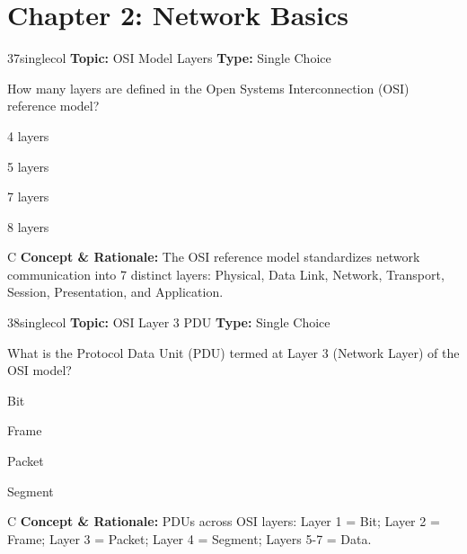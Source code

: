 \section{Chapter 2: Network Basics}

\begin{qcard}{37}{singlecol}
\textcolor{darkslate!75}{\small\textbf{Topic:} OSI Model Layers \hfill \textbf{Type:} Single Choice}\vspace{0.4em}\par
How many layers are defined in the Open Systems Interconnection (OSI) reference model?
\begin{qoptions}
\item 4 layers
\item 5 layers
\item 7 layers
\item 8 layers
\end{qoptions}
\end{qcard}
\nopagebreak
\begin{explainbox}{C}
\textbf{Concept \& Rationale:} The OSI reference model standardizes network communication into 7 distinct layers: Physical, Data Link, Network, Transport, Session, Presentation, and Application.
\end{explainbox}

\begin{qcard}{38}{singlecol}
\textcolor{darkslate!75}{\small\textbf{Topic:} OSI Layer 3 PDU \hfill \textbf{Type:} Single Choice}\vspace{0.4em}\par
What is the Protocol Data Unit (PDU) termed at Layer 3 (Network Layer) of the OSI model?
\begin{qoptions}
\item Bit
\item Frame
\item Packet
\item Segment
\end{qoptions}
\end{qcard}
\nopagebreak
\begin{explainbox}{C}
\textbf{Concept \& Rationale:} PDUs across OSI layers: Layer 1 = Bit; Layer 2 = Frame; Layer 3 = Packet; Layer 4 = Segment; Layers 5-7 = Data.
\end{explainbox}

